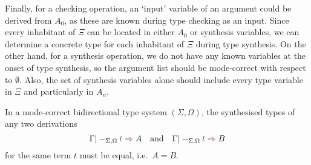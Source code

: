 Finally, for a checking operation, an `input' variable of an argument could be derived from $A_0$, as these are known during type checking as an input.
Since every inhabitant of $\Xi$ can be located in either $A_0$ or synthesis variables, we can determine a concrete type for each inhabitant of $\Xi$ during type synthesis.
On the other hand, for a synthesis operation, we do not have any known variables at the onset of type synthesis, so the argument list should be mode-correct with respect to $\emptyset$.
Also, the set of synthesis variables alone should include every type variable in $\Xi$ and particularly in $A_n$.


\begin{lemma}\label{thm:unique-syn}
  In a mode-correct bidirectional type system $(\Sigma, \Omega)$, the synthesised types of any two derivations
  \[
    \Gamma |-_{\Sigma, \Omega} \isTerm{t} \syn A
    \quad\text{and}\quad
    \Gamma |-_{\Sigma, \Omega} \isTerm{t} \syn B
  \]
  for the same term $t$ must be equal, i.e.\ $A = B$.
\end{lemma}
